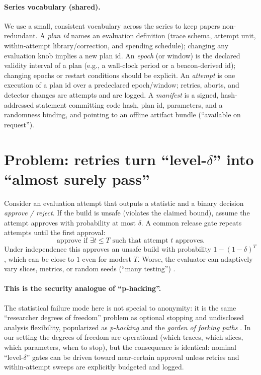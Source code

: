 \documentclass[11pt]{article}
\begin{document}
\paragraph{Series vocabulary (shared).}
We use a small, consistent vocabulary across the series to keep papers non-redundant.
A \emph{plan id} names an evaluation definition (trace schema, attempt unit, within-attempt library/correction, and spending schedule);
changing any evaluation knob implies a new plan id.
An \emph{epoch} (or window) is the declared validity interval of a plan (e.g., a wall-clock period or a beacon-derived id); changing epochs or restart conditions should be explicit.
An \emph{attempt} is one execution of a plan id over a predeclared epoch/window; retries, aborts, and detector changes are attempts and are logged.
A \emph{manifest} is a signed, hash-addressed statement committing code hash, plan id, parameters, and a randomness binding, and pointing to an offline artifact bundle (``available on request'').


\section{Problem: retries turn \texorpdfstring{``level-$\delta$''}{``level-delta''} into ``almost surely pass''}
Consider an evaluation attempt that outputs a statistic and a binary decision \emph{approve / reject}.
If the build is unsafe (violates the claimed bound), assume the attempt approves with probability at most $\delta$.
A common release gate repeats attempts until the first approval:
\[
\text{approve if } \exists t \le T \text{ such that attempt $t$ approves.}
\]
Under independence this approves an unsafe build with probability $1-(1-\delta)^T$, which can be close to $1$ even for modest $T$.
Worse, the evaluator can adaptively vary slices, metrics, or random seeds (``many testing'') \cite{series:manytestinglowerbounds}.

\paragraph{This is the security analogue of ``p-hacking''.}
The statistical failure mode here is not special to anonymity: it is the same ``researcher degrees of freedom'' problem as optional stopping and undisclosed analysis flexibility,
popularized as \emph{p-hacking} and the \emph{garden of forking paths} \cite{simmons2011falsepositive,gelman2013forkingpaths}.
In our setting the degrees of freedom are operational (which traces, which slices, which parameters, when to stop), but the consequence is identical:
nominal ``level-$\delta$'' gates can be driven toward near-certain approval unless retries and within-attempt sweeps are explicitly budgeted and logged.
\end{document}
